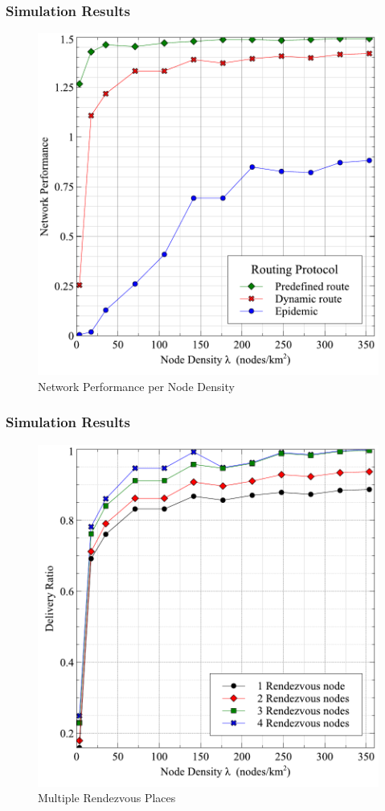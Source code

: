 \documentclass{beamer}
\begin{document}
\begin{frame}
	\frametitle{Simulation Results}
	\begin{figure}
		\centering
		\includegraphics[width=0.6\linewidth]{Figures_Present/NetworkPerformance}
		\caption{Network Performance per Node Density}
		\label{fig:NetworkPerformance}
	\end{figure}
\end{frame}
\begin{frame}
	\frametitle{Simulation Results}
\begin{figure}
\centering
\includegraphics[width=0.6\linewidth]{Figures_Present/MultipleRVs}
\caption{Multiple Rendezvous Places}
\label{fig:MultipleRVs}
\end{figure}
\end{frame}
\end{document}
